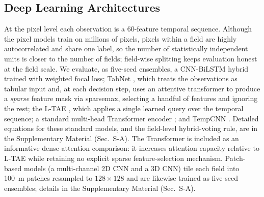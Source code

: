 \documentclass[journal]{IEEEtran}
\begin{document}
\subsection{Deep Learning Architectures}
At the pixel level each observation is a 60-feature temporal sequence. Although the pixel models train on millions of pixels, pixels within a field are highly autocorrelated and share one label, so the number of statistically independent units is closer to the number of fields; field-wise splitting keeps evaluation honest at the field scale. We evaluate, as five-seed ensembles, a CNN-BiLSTM hybrid trained with weighted focal loss; TabNet \cite{tabnet_orig, tabnet2024}, which treats the observations as tabular input and, at each decision step, uses an attentive transformer to produce a \emph{sparse} feature mask via sparsemax, selecting a handful of features and ignoring the rest; the L-TAE \cite{ltae2020}, which applies a single learned query over the temporal sequence; a standard multi-head Transformer encoder \cite{vaswani2017, russwurm2020}; and TempCNN \cite{tempcnn2019}. Detailed equations for these standard models, and the field-level hybrid-voting rule, are in the Supplementary Material (Sec.~S-A). The Transformer is included as an informative dense-attention comparison: it increases attention capacity relative to L-TAE while retaining no explicit sparse feature-selection mechanism. Patch-based models (a multi-channel 2D CNN and a 3D CNN) tile each field into 100~m patches resampled to $128\times128$ and are likewise trained as five-seed ensembles; details in the Supplementary Material (Sec.~S-A).
\end{document}
